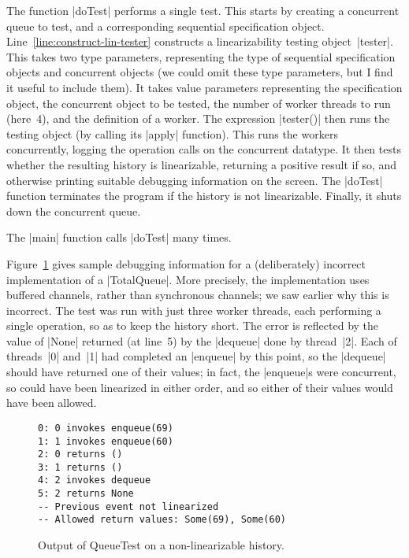 The function |doTest| performs a single test.  This starts by creating a
concurrent queue to test, and a corresponding sequential specification object.
Line~\ref{line:construct-lin-tester} constructs a linearizability testing
object~|tester|.  This takes two type parameters, representing the type of
sequential specification objects and concurrent objects (we could omit these
type parameters, but I find it useful to include them).  It takes value
parameters representing the specification object, the concurrent object to be
tested, the number of worker threads to run (here~4), and the definition of a
worker.
%
The expression |tester()| then runs the testing object (by calling its |apply|
function).  This runs the workers concurrently, logging the operation calls on
the concurrent datatype.  It then tests whether the resulting history is
linearizable, returning a positive result if so, and otherwise printing
suitable debugging information on the screen.  The |doTest| function
terminates the program if the history is not linearizable.  Finally, it shuts
down the concurrent queue.

The |main| function calls |doTest| many times. 

Figure~\ref{fig:lin-testing-error} gives sample debugging information for a
(deliberately) incorrect implementation of a |TotalQueue|.  More precisely,
the implementation uses buffered channels, rather than synchronous channels;
we saw earlier why this is incorrect.  The test was run with just three worker
threads, each performing a single operation, so as to keep the history short.
The error is reflected by the value of |None| returned (at line~5) by the
|dequeue| done by thread~|2|.  Each of threads~|0| and~|1| had completed an
|enqueue| by this point, so the |dequeue| should have returned one of their
values; in fact, the |enqueue|s were concurrent, so could have been linearized
in either order, and so either of their values would have been allowed.


\begin{figure}
\begin{verbatim}
0: 0 invokes enqueue(69)
1: 1 invokes enqueue(60)
2: 0 returns ()
3: 1 returns ()
4: 2 invokes dequeue
5: 2 returns None
-- Previous event not linearized
-- Allowed return values: Some(69), Some(60)
\end{verbatim}
\caption{Output of {\scalashape QueueTest} on a non-linearizable history.}
\label{fig:lin-testing-error}
\end{figure}

